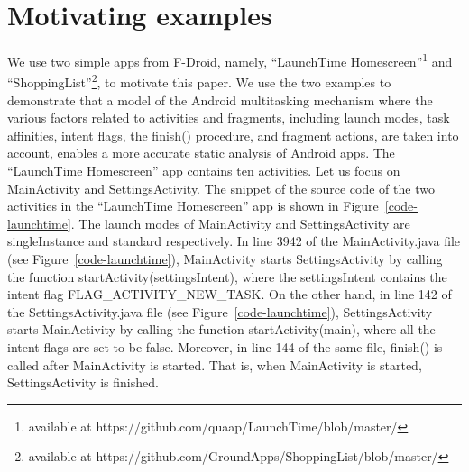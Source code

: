 \section{Motivating examples}\label{sec-motiv-exmp}
%
We use two simple apps from F-Droid, namely, ``LaunchTime Homescreen''\footnote{available at https://github.com/quaap/LaunchTime/blob/master/} and ``ShoppingList''\footnote{available at https://github.com/GroundApps/ShoppingList/blob/master/}, to motivate this paper. We use the two examples to demonstrate that a model of the Android multitasking mechanism where the various factors related to activities and fragments, including launch modes, task affinities, intent flags, the finish() procedure, and fragment actions, are taken into account, enables a more accurate static analysis of Android apps.  
%
The ``LaunchTime Homescreen'' app contains ten activities. Let us focus on MainActivity and SettingsActivity. The snippet of the source code of the two activities in the ``LaunchTime Homescreen'' app is shown in Figure~\ref{code-launchtime}. The launch modes of MainActivity and SettingsActivity are singleInstance and standard respectively. 
In line 3942 of the MainActivity.java file (see Figure~\ref{code-launchtime}), MainActivity starts SettingsActivity by calling the function startActivity(settingsIntent), where the settingsIntent contains the intent flag FLAG\_ACTIVITY\_NEW\_TASK. 
On the other hand, in line 142 of the SettingsActivity.java file (see Figure~\ref{code-launchtime}), SettingsActivity starts MainActivity by calling the function startActivity(main), where all the intent flags are set to be false. Moreover, in line 144 of the same file, finish() is called after MainActivity is started. That is, when MainActivity is started, SettingsActivity is finished. 


